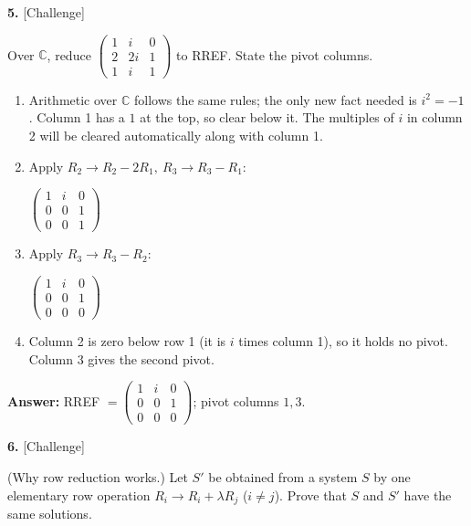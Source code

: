 \documentclass[11pt]{article}
\begin{document}
\begin{minipage}{\linewidth}\textbf{5.} \hfill{\scriptsize\color{ink}[Challenge]}\par\nopagebreak Over $\mathbb{C}$, reduce $\begin{pmatrix}1 & i & 0 \\ 2 & 2i & 1 \\ 1 & i & 1\end{pmatrix}$ to RREF. State the pivot columns.
\end{minipage}\par\nopagebreak
\begin{tcolorbox}[breakable,colback=ans,colframe=ansb,boxrule=0.5pt,left=4pt,right=4pt,top=2pt,bottom=2pt]\begin{enumerate}[leftmargin=2.2em,itemsep=1pt,topsep=1pt,label=\textbf{Step \arabic*.}]\item Arithmetic over $\mathbb{C}$ follows the same rules; the only new fact needed is $i^{2}=-1$. Column 1 has a $1$ at the top, so clear below it. The multiples of $i$ in column 2 will be cleared automatically along with column 1.
\item Apply $R_2\to R_2-2R_1,\ R_3\to R_3-R_1$:\par\smallskip $\displaystyle \begin{pmatrix}1 & i & 0 \\ 0 & 0 & 1 \\ 0 & 0 & 1\end{pmatrix}$
\item Apply $R_3\to R_3-R_2$:\par\smallskip $\displaystyle \begin{pmatrix}1 & i & 0 \\ 0 & 0 & 1 \\ 0 & 0 & 0\end{pmatrix}$
\item Column 2 is zero below row 1 (it is $i$ times column 1), so it holds no pivot. Column 3 gives the second pivot.
\end{enumerate}\textbf{Answer:} RREF $=\begin{pmatrix}1 & i & 0 \\ 0 & 0 & 1 \\ 0 & 0 & 0\end{pmatrix}$; pivot columns $1,3$.\end{tcolorbox}
\par\vspace{2pt}
\begin{minipage}{\linewidth}\textbf{6.} \hfill{\scriptsize\color{ink}[Challenge]}\par\nopagebreak (Why row reduction works.) Let $S'$ be obtained from a system $S$ by one elementary row operation $R_i\to R_i+\lambda R_j$ ($i\neq j$). Prove that $S$ and $S'$ have the same solutions.
\end{minipage}\par\nopagebreak
\end{document}
